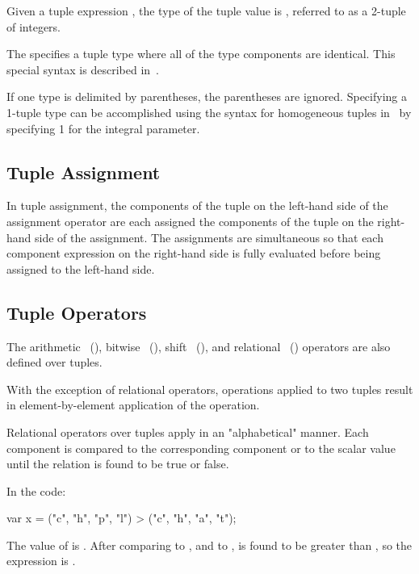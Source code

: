 \begin{example}
Given a tuple expression , the type of the tuple value is
, referred to as a 2-tuple of integers.
\end{example}

The  specifies a tuple type where all of
the type components are identical.  This special syntax is described
in~.

If one type is delimited by parentheses, the parentheses are ignored.
Specifying a 1-tuple type can be accomplished using the syntax for
homogeneous tuples in~ by specifying 1 for
the integral parameter.

\subsection{Tuple Assignment}
\label{Tuple_Assignment}

In tuple assignment, the components of the tuple on the left-hand
side of the assignment operator are each assigned the components of
the tuple on the right-hand side of the assignment.  The assignments
are simultaneous so that each component expression on the right-hand
side is fully evaluated before being assigned to the left-hand side.

\subsection{Tuple Operators}
\label{Tuple_Operators}

The arithmetic ~(), bitwise
~(), shift ~(), and
relational ~() operators are also defined
over tuples.

With the exception of relational operators, operations applied to two
tuples result in element-by-element application of the operation.

Relational operators over tuples apply in an "alphabetical" manner.
Each component is compared to the corresponding component or to the
scalar value until the relation is found to be true or false.

\begin{example}
In the code:
\begin{chapel}
var x = ("c", "h", "p", "l") > ("c", "h", "a", "t"); 
\end{chapel}
The value of  is . After comparing  to
, and  to ,  is found to be
greater than , so the expression is . 
\end{example}

